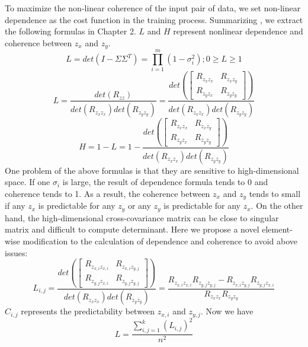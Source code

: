 \documentclass[12pt]{report} %
\begin{document}
To maximize the non-linear coherence of the input pair of data, we set non-linear dependence as the cost function in the training process. Summarizing \cite{ECCA}, we extract the following formulas in Chapter 2. $L$ and $H$ represent nonlinear dependence and coherence between $z_x$ and $z_y$.
\begin{equation}
L=det(I-\Sigma\Sigma^T)=\prod_{i=1}^{m}(1-\sigma_i^2);0 \geq L \geq 1
\end{equation}
\begin{equation}
L=\frac{det(R_{zz})}
{det(R_{z_{x}z_{x}})det(R_{z_{y}z_{y}})}=\frac{det\left(\begin{bmatrix}
	R_{z_{x}z_{x}} & R_{z_{x}z_{y}} \\
	R_{z_{y}z_{x}} & R_{z_{y}z_{y}}
	\end{bmatrix}\right)}
{det(R_{z_{x}z_{x}})det(R_{z_{y}z_{y}})}
\end{equation}
\begin{equation}
H=1-L=1-\frac{det\left(\begin{bmatrix}
	R_{z_{x}z_{x}} & R_{z_{x}z_{y}} \\
	R_{z_{y}z_{x}} & R_{z_{y}z_{y}}
	\end{bmatrix}\right)}
{det(R_{z_{x}z_{x}})det(R_{z_{y}z_{y}})}
\end{equation}
One problem of the above formulas is that they are sensitive to high-dimensional space. If one \(\sigma_i\) is large, the result of dependence formula tends to 0 and coherence tends to 1. As a result, the coherence between $z_x$ and $z_y$ tends to small if any $z_x$ is predictable for any $z_y$ or any $z_y$ is predictable for any $z_x$. On the other hand, the high-dimensional cross-covariance matrix can be close to singular matrix and difficult to compute determinant. Here we propose a novel element-wise modification to the calculation of dependence and coherence to avoid above issues:
\begin{equation}
L_{i,j}=\frac{det\left(\begin{bmatrix}
	R_{z_{x,i}z_{x,i}} & R_{z_{x,i}z_{y,j}} \\
	R_{z_{y,j}z_{x,i}} & R_{z_{y,j}z_{y,j}}
	\end{bmatrix}\right)}
{det(R_{z_{x}z_{x}})det(R_{z_{y}z_{y}})}=
\frac{R_{z_{x,i}z_{x,i}}R_{z_{y,j}z_{y,j}}-R_{z_{x,i}z_{y,j}}R_{z_{y,j}z_{x,i}}}
{R_{z_{x}z_{x}}R_{z_{y}z_{y}}}
\end{equation}
\(C_{i,j}\) represents the predictability between $z_{x,i}$ and $z_{y,j}$. Now we have
\begin{equation}
L=\frac{\sum_{i,j=1}^{k}(L_{i,j})^2}{n^2}
\end{equation}
\end{document}
